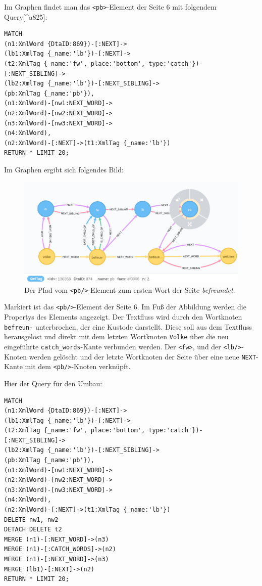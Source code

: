 \documentclass[ngerman,]{scrreprt}
\begin{document}
Im Graphen findet man das \texttt{\textless{}pb\textgreater{}}-Element der Seite 6 mit folgendem Query{[}\^{}a825{]}:

\begin{verbatim}
MATCH
(n1:XmlWord {DtaID:869})-[:NEXT]->
(lb1:XmlTag {_name:'lb'})-[:NEXT]->
(t2:XmlTag {_name:'fw', place:'bottom', type:'catch'})-[:NEXT_SIBLING]->
(lb2:XmlTag {_name:'lb'})-[:NEXT_SIBLING]->
(pb:XmlTag {_name:'pb'}),
(n1:XmlWord)-[nw1:NEXT_WORD]->
(n2:XmlWord)-[nw2:NEXT_WORD]->
(n3:XmlWord)-[nw3:NEXT_WORD]->
(n4:XmlWord),
(n2:XmlWord)-[:NEXT]->(t1:XmlTag {_name:'lb'})
RETURN * LIMIT 20;
\end{verbatim}

Im Graphen ergibt sich folgendes Bild:

\begin{figure}
\centering
\includegraphics{Bilder/TEI2Graph/pb6-Bestand.png}
\caption{Der Pfad vom \texttt{\textless{}pb/\textgreater{}}-Element zum ersten Wort der Seite \emph{befreundet}.}
\end{figure}

Markiert ist das \texttt{\textless{}pb/\textgreater{}}-Element der Seite 6. Im Fuß der Abbildung werden die Propertys des Elements angezeigt. Der Textfluss wird durch den Wortknoten \texttt{befreun-} unterbrochen, der eine Kustode darstellt. Diese soll aus dem Textfluss herausgelöst und direkt mit dem letzten Wortknoten \texttt{Volke} über die neu eingeführte \texttt{catch\_words}-Kante verbunden werden. Der \texttt{\textless{}fw\textgreater{}}, und der \texttt{\textless{}lb/\textgreater{}}-Knoten werden gelöscht und der letzte Wortknoten der Seite über eine neue \texttt{NEXT}-Kante mit dem \texttt{\textless{}pb/\textgreater{}}-Knoten verknüpft.

Hier der Query für den Umbau:

\begin{verbatim}
MATCH
(n1:XmlWord {DtaID:869})-[:NEXT]->
(lb1:XmlTag {_name:'lb'})-[:NEXT]->
(t2:XmlTag {_name:'fw', place:'bottom', type:'catch'})-[:NEXT_SIBLING]->
(lb2:XmlTag {_name:'lb'})-[:NEXT_SIBLING]->
(pb:XmlTag {_name:'pb'}),
(n1:XmlWord)-[nw1:NEXT_WORD]->
(n2:XmlWord)-[nw2:NEXT_WORD]->
(n3:XmlWord)-[nw3:NEXT_WORD]->
(n4:XmlWord),
(n2:XmlWord)-[:NEXT]->(t1:XmlTag {_name:'lb'})
DELETE nw1, nw2
DETACH DELETE t2
MERGE (n1)-[:NEXT_WORD]->(n3)
MERGE (n1)-[:CATCH_WORDS]->(n2)
MERGE (n1)-[:NEXT_WORD]->(n3)
MERGE (lb1)-[:NEXT]->(n2)
RETURN * LIMIT 20;
\end{verbatim}
\end{document}
